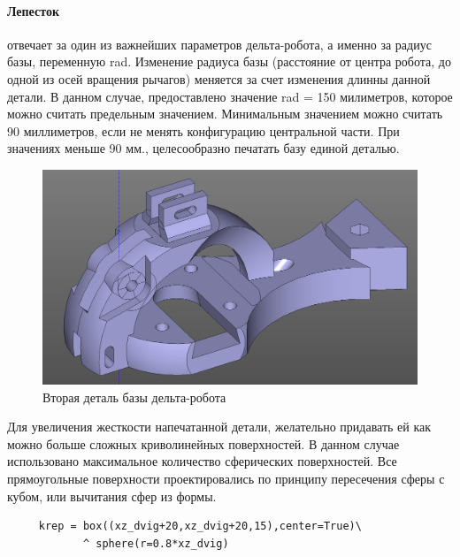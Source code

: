 \paragraph{Лепесток} отвечает за один из важнейших параметров дельта-робота, а именно за радиус базы, переменную rad. Изменение радиуса базы (расстояние от центра робота, до одной из осей вращения рычагов) меняется за счет изменения длинны данной детали. В данном случае, предоставлено значение rad = 150 милиметров, которое можно считать предельным значением. Минимальным значением можно считать 90 миллиметров, если не менять конфигурацию центральной части. При значениях меньше 90 мм., целесообразно печатать базу единой деталью.   

\begin{figure}[h!]
	\centering
	\includegraphics[width=0.8\linewidth]{./image/lepestok}
	\caption{Вторая деталь базы дельта-робота}
\end{figure} 

Для увеличения жесткости напечатанной детали, желательно придавать ей как можно больше сложных криволинейных поверхностей. В данном случае использовано максимальное количество сферических поверхностей. Все прямоугольные поверхности проектировались по принципу пересечения сферы с кубом, или вычитания сфер из формы. 

\begin{verbatim}
     krep = box((xz_dvig+20,xz_dvig+20,15),center=True)\
            ^ sphere(r=0.8*xz_dvig)
\end{verbatim}

